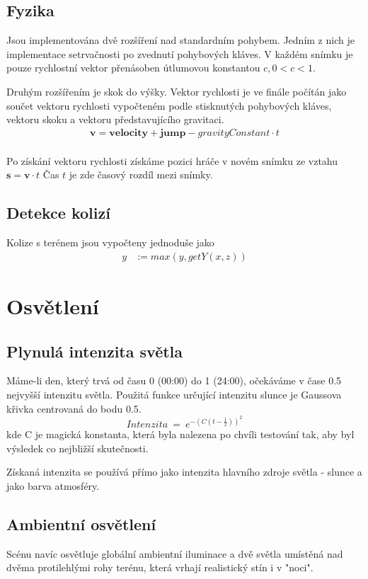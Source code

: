 \documentclass[11pt]{article}
\begin{document}
\subsection{Fyzika}
Jsou implementována dvě rozšíření nad standardním pohybem. Jedním z nich je implementace setrvačnosti po zvednutí pohybových kláves. V každém snímku je pouze rychlostní vektor přenásoben útlumovou konstantou $c, 0 < c < 1$.

Druhým rozšířením je skok do výšky. Vektor rychlosti je ve finále počítán jako
součet vektoru rychlosti vypočteném podle stisknutých pohybových kláves,
vektoru skoku a vektoru představujícího gravitaci.
\begin{align*}
\mathbf{v} = \mathbf{velocity}+ \mathbf{jump} - gravityConstant \cdot t \\
\end{align*}

Po získání vektoru rychlosti získáme pozici hráče v novém snímku ze vztahu
$\mathbf{s} = \mathbf{v} \cdot t$
Čas $t$ je zde časový rozdíl mezi snímky.

\subsection{Detekce kolizí}
Kolize s terénem jsou vypočteny jednoduše jako 
\begin{align*}
y &:= max(y, getY(x, z))
\end{align*}



\section{Osvětlení}
\subsection{Plynulá intenzita světla}
Máme-li den, který trvá od času 0 (00:00) do 1 (24:00), očekáváme v čase 0.5
nejvyšší intenzitu světla. Použitá funkce určující intenzitu slunce je Gaussova
křivka centrovaná do bodu 0.5.
$$
Intenzita~=~e^{- (C(t - \frac{1}{2}))^2}
$$
kde C je magická konstanta, která byla nalezena po chvíli testování tak, aby
byl výsledek co nejbližší skutečnosti.

Získaná intenzita se používá přímo jako intenzita hlavního zdroje světla - slunce a jako barva atmosféry.
\subsection{Ambientní osvětlení}
Scénu navíc osvětluje globální ambientní iluminace a dvě světla umístěná nad
dvěma protilehlými rohy terénu, která vrhají realistický stín i v "noci".
\end{document}
